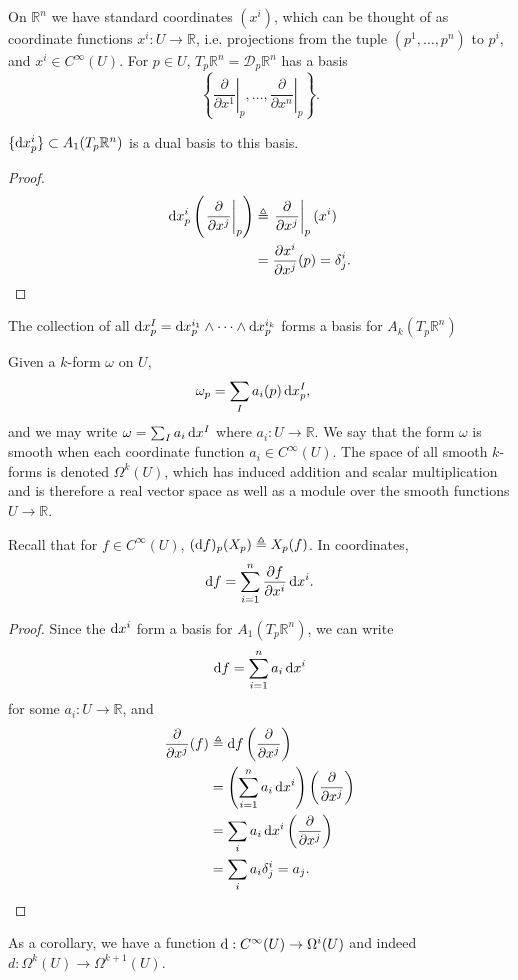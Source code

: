 On $\mathbb{R}^n$ we have standard coordinates $(x^i)$, which can be
thought of as coordinate functions $x^i: U \to \mathbb{R}$,
i.e. projections from the tuple $(p^1, \dots, p^n)$ to $p^i$, and
$x^i \in C^\infty(U)$. For $p \in U$,
$T_p \mathbb{R}^n = \mathcal{D}_p \mathbb{R}^n$ has a basis
$$
\left\{ \left.\frac{\partial}{\partial x^1}\right|_p,
         \dots,
         \left.\frac{\partial}{\partial x^n}\right|_p
\right\}.
$$
\begin{lemma}
$\{\mathop{}\!\mathrm{d} x_p^i\} \subset A_1(T_p \mathbb{R}^n)$ is a dual basis to this basis.
\end{lemma}
\begin{proof}
\begin{align*}
  \mathop{}\!\mathrm{d} x_p^i
    \left(
      \left.\frac{\partial}{\partial x^j}\right|_p
    \right)
&\triangleq
  \left.\frac{\partial}{\partial x^j}\right|_p(x^i) \\
&= \frac{\partial x^i}{\partial x^j}(p)
 = \delta_j^i.
\end{align*}
\end{proof}

\begin{corol}
The collection of all
$\mathop{}\!\mathrm{d} x_p^I = \mathop{}\!\mathrm{d} x_p^{i_1} \wedge \cdots \wedge \mathop{}\!\mathrm{d} x_p^{i_k}$
forms a basis for $A_k(T_p \mathbb{R}^n)$
\end{corol}

\begin{defn}
Given a $k$-form $\omega$ on $U$,
\begin{align*}
   \omega_p
&= \sum_I a_i(p) \mathop{}\!\mathrm{d} x_p^I,
\end{align*}
and we may write $\omega = \sum_I a_i \mathop{}\!\mathrm{d} x^I$ where
$a_i: U \to \mathbb{R}$. We say that the form $\omega$ is smooth when
each coordinate function $a_i \in C^\infty(U)$. The space of all
smooth $k$-forms is denoted $\Omega^k(U)$, which has induced addition
and scalar multiplication and is therefore a real vector space as well as a
module over the smooth functions $U \to \mathbb{R}$.
\end{defn}

\begin{prop}
Recall that for $f \in C^\infty(U)$,
$(\mathop{}\!\mathrm{d} f)_p (X_p) \triangleq X_p(f)$. In coordinates,
$$
  \mathop{}\!\mathrm{d} f
= \sum_{i=1}^n \frac{\partial f}{\partial x^i} \mathop{}\!\mathrm{d} x^i.
$$
\end{prop}
\begin{proof}
Since the $\mathop{}\!\mathrm{d} x^i$ form a basis for
$A_1(T_p \mathbb{R}^n)$, we can write
$$
  \mathop{}\!\mathrm{d} f
= \sum_{i=1}^n a_i \mathop{}\!\mathrm{d} x^i
$$
for some $a_i : U \to \mathbb{R}$, and
\begin{align*}
   \frac{\partial}{\partial x^j}(f)
&\triangleq
   \mathop{}\!\mathrm{d} f \left(
     \frac{\partial}{\partial x^j}
   \right) \\
&= \left(
     \sum_{i=1}^n a_i \mathop{}\!\mathrm{d} x^i
   \right)
   \left(
     \frac{\partial}{\partial x^j}
   \right) \\
&= \sum_i
     a_i \mathop{}\!\mathrm{d} x^i
     \left(
       \frac{\partial}{\partial x^j}
     \right) \\
&= \sum_i a_i \delta_j^i = a_j.
\end{align*}
\end{proof}
As a corollary, we have a function
$\mathop{}\!\mathrm{d} : C^\infty(U) \to \Omega^i(U)$ and indeed
$d: \Omega^k(U) \to \Omega^{k+1}(U)$.


